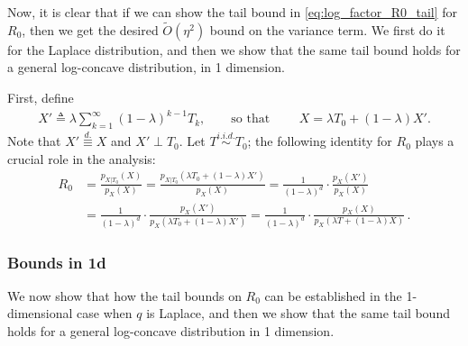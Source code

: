 Now, it is clear that if we can show the tail bound in \eqref{eq:log_factor_R0_tail} for $R_0$, then we get the desired $\tilde{O}(\eta^2)$ bound on the variance term.
We first do it for the Laplace distribution, and then we show that the same tail bound holds for a general log-concave distribution, in 1 dimension.

\noindent
First, define
\begin{align}
    X'\triangleq\lambda\sum_{k=1}^\infty (1-\lambda)^{k-1} T_k,
    \qquad
    \text{so that }\qquad
    X=\lambda T_0+(1-\lambda) X'.
\end{align}
Note that $X' \stackrel{d.}{\equiv} X$ and $X' \perp T_0$.
Let $T \stackrel{i.i.d.}{\sim} T_0$; the following identity for $R_0$ plays a crucial role in the analysis:
\begin{align}
    R_0
     & =
    \frac{p_{X|T_0}(X)}{p_X(X)}
    =
    \frac{p_{X|T_0}(\lambda T_0 + (1-\lambda) X')}{p_{X}(X)}
    =
    \frac{1}{(1-\lambda)^d}\cdot \frac{p_X(X')}{p_X(X)}
    \label{eq:R0_identity_1}
    \\
     & =
    \frac{1}{(1-\lambda)^d}\cdot \frac{p_X(X')}{p_X(\lambda T_0+(1-\lambda)X')}
    =
    \frac{1}{(1-\lambda)^d}\cdot \frac{p_X(X)}{p_X(\lambda T+(1-\lambda)X)}\,.
    \label{eq:R0_identity_2}
\end{align}

\subsubsection{Bounds in 1d}
We now show that how the tail bounds on $R_0$ can be established in the 1-dimensional case when $q$ is Laplace, and then we show that the same tail bound holds for a general log-concave distribution in 1 dimension.

